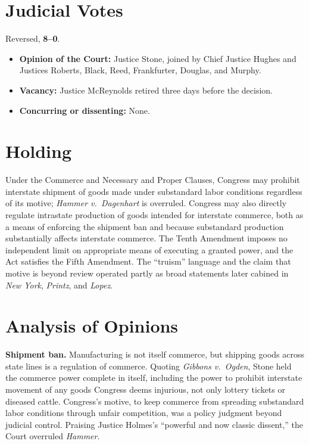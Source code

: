 \documentclass[12pt]{article}
\begin{document}
\section{Judicial Votes}

Reversed, \textbf{8--0}.
\begin{itemize}
\item \textbf{Opinion of the Court:} Justice Stone, joined by Chief Justice Hughes and Justices Roberts, Black, Reed, Frankfurter, Douglas, and Murphy.
\item \textbf{Vacancy:} Justice McReynolds retired three days before the decision.
\item \textbf{Concurring or dissenting:} None.
\end{itemize}

\section{Holding}

Under the Commerce and Necessary and Proper Clauses, Congress may prohibit interstate shipment of goods made under substandard labor conditions regardless of its motive; \textit{Hammer v.\ Dagenhart} is overruled. Congress may also directly regulate intrastate production of goods intended for interstate commerce, both as a means of enforcing the shipment ban and because substandard production substantially affects interstate commerce. The Tenth Amendment imposes no independent limit on appropriate means of executing a granted power, and the Act satisfies the Fifth Amendment. The ``truism'' language and the claim that motive is beyond review operated partly as broad statements later cabined in \textit{New York}, \textit{Printz}, and \textit{Lopez}.

\section{Analysis of Opinions}

\textbf{Shipment ban.} Manufacturing is not itself commerce, but shipping goods across state lines is a regulation of commerce. Quoting \textit{Gibbons v.\ Ogden}, Stone held the commerce power complete in itself, including the power to prohibit interstate movement of any goods Congress deems injurious, not only lottery tickets or diseased cattle. Congress's motive, to keep commerce from spreading substandard labor conditions through unfair competition, was a policy judgment beyond judicial control. Praising Justice Holmes's ``powerful and now classic dissent,'' the Court overruled \textit{Hammer}.
\end{document}
